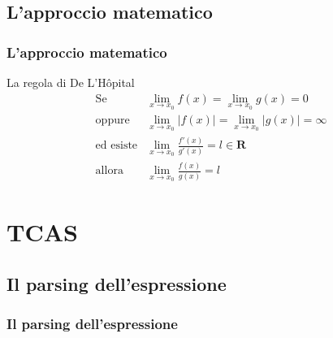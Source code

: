 \documentclass{beamer}
\begin{document}
	\subsection{L'approccio matematico}
	\begin{frame}
		\frametitle{L'approccio matematico}
		\begin{block}{La regola di De L'Hôpital}
			\[
			\begin{aligned}
				\text{Se} &\lim_{x \to x_{0}}{f(x)} = \lim_{x \to x_{0}}{g(x)} = 0 \\ \text{oppure} &\lim_{x \to x_{0}}{\lvert f(x) \rvert} = \lim_{x \to x_{0}}{\lvert g(x) \rvert} = \infty \\ \text{ed esiste} &\lim_{x \to x_{0}}{\frac{f'(x)}{g'(x)}} = l \in \mathbf{R} \\ \text{allora} &\lim_{x \to x_{0}}{\frac{f(x)}{g(x)}} = l
			\end{aligned}
			\]
		\end{block}
	\end{frame}
	
	\section{TCAS}
	
	\subsection{Il parsing dell'espressione}
	\begin{frame}
		\frametitle{Il parsing dell'espressione}
	\end{frame}
	
	
	
\end{document}
